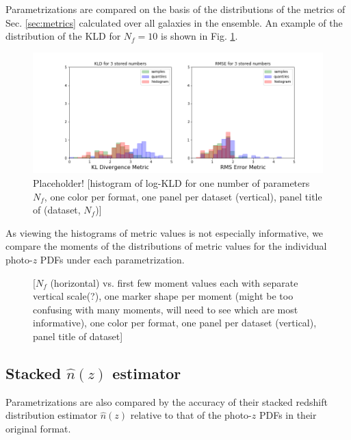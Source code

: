 \documentclass[\docopts]{\docclass}
\newcommand{\pz}{photo-$z$ PDF}
\begin{document}
Parametrizations are compared on the basis of the distributions of the metrics 
of Sec. \ref{sec:metrics} calculated over all galaxies in the ensemble.  An 
example of the distribution of the KLD for $N_{f}=10$ is shown in Fig. 
\ref{fig:individual}.

\begin{figure}
  \includegraphics[width=0.9\columnwidth]{figures/individual_placeholder.png}
  \caption{Placeholder! [histogram of log-KLD for one number of parameters 
$N_{f}$, one color per format, one panel per dataset (vertical), panel title of 
(dataset, $N_{f}$)]
  \label{fig:individual}}
\end{figure}

As viewing the histograms of metric values is not especially informative, we 
compare the moments of the distributions of metric values for the individual 
\pz s under each parametrization.

\begin{figure}
  \caption{ [$N_{f}$ (horizontal) vs. first few 
moment values each with separate vertical scale(?), one marker shape per moment 
(might be too confusing with many moments, will need to see which are most 
informative), one color per format, one panel per dataset (vertical), panel 
title of dataset]
  \label{fig:moments}}
\end{figure}


\subsection{Stacked $\hat{n}(z)$ estimator}
\label{sec:stacked}

Parametrizations are also compared by the accuracy of their stacked redshift 
distribution estimator $\hat{n}(z)$ relative to that of the \pz s in their 
original format.
\end{document}
